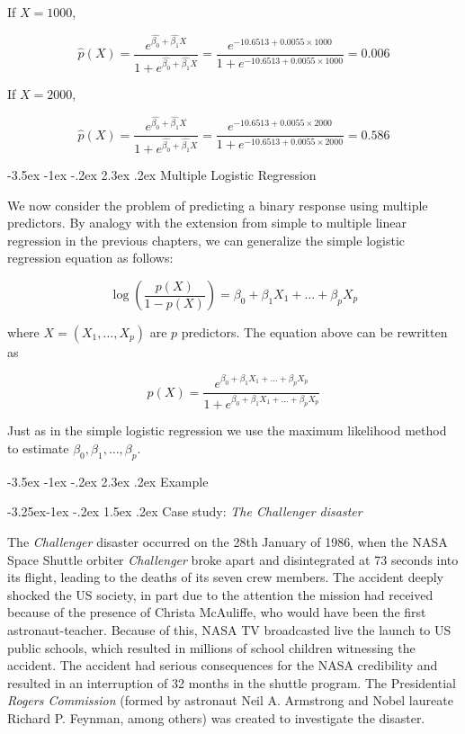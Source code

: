 \documentclass[]{book}
\makeatletter
\renewcommand\section{\@startsection {section}{1}{\z@}%
                                   {-3.5ex \@plus -1ex \@minus -.2ex}%
                                   {2.3ex \@plus.2ex}%
                                   {\normalfont\Large\bfseries\color{ForestGreen}}}
\renewcommand\subsection{\@startsection{subsection}{2}{\z@}%
                                     {-3.25ex\@plus -1ex \@minus -.2ex}%
                                     {1.5ex \@plus .2ex}%
                                     {\normalfont\large\bfseries\color{Violet}}}
\theoremstyle{definition}
\theoremstyle{definition}
\theoremstyle{definition}
\theoremstyle{remark}
\makeatother
\begin{document}
If \(X=1000\),

\[ \hat{p}(X) = \frac{e^{\hat{\beta_0} + \hat{\beta_1} X}}{1+e^{\hat{\beta_0} + \hat{\beta_1} X}} = \frac{e^{-10.6513+0.0055 \times 1000}}{1+e^{-10.6513+0.0055 \times 1000}} = 0.006\]

If \(X=2000\),

\[ \hat{p}(X) = \frac{e^{\hat{\beta_0} + \hat{\beta_1} X}}{1+e^{\hat{\beta_0} + \hat{\beta_1} X}} = \frac{e^{-10.6513+0.0055 \times 2000}}{1+e^{-10.6513+0.0055 \times 2000}} = 0.586\]

\section{Multiple Logistic
Regression}\label{multiple-logistic-regression}

We now consider the problem of predicting a binary response using
multiple predictors. By analogy with the extension from simple to
multiple linear regression in the previous chapters, we can generalize
the simple logistic regression equation as follows:

\[ \log( \frac{p(X)}{1-p(X)} ) = \beta_0 + \beta_1 X_1 +  \ldots + \beta_p X_p\]

where \(X=(X_1,\ldots,X_p)\) are \(p\) predictors. The equation above
can be rewritten as

\[ p(X) = \frac{e^{\beta_0 + \beta_1 X_1 +  \ldots + \beta_p X_p}}{1+e^{\beta_0 + \beta_1 X_1 +  \ldots + \beta_p X_p}} \]

Just as in the simple logistic regression we use the maximum likelihood
method to estimate \(\beta_0,\beta_1,\ldots,\beta_p\).

\section{Example}\label{logreg-examps}

\subsection{\texorpdfstring{Case study: \emph{The Challenger
disaster}}{Case study: The Challenger disaster}}\label{logreg-examps-challenger}

The \emph{Challenger} disaster occurred on the 28th January of 1986,
when the NASA Space Shuttle orbiter \emph{Challenger} broke apart and
disintegrated at 73 seconds into its flight, leading to the deaths of
its seven crew members. The accident deeply shocked the US society, in
part due to the attention the mission had received because of the
presence of Christa McAuliffe, who would have been the first
astronaut-teacher. Because of this, NASA TV broadcasted live the launch
to US public schools, which resulted in millions of school children
witnessing the accident. The accident had serious consequences for the
NASA credibility and resulted in an interruption of 32 months in the
shuttle program. The Presidential \emph{Rogers Commission} (formed by
astronaut Neil A. Armstrong and Nobel laureate Richard P. Feynman, among
others) was created to investigate the disaster.
\end{document}
